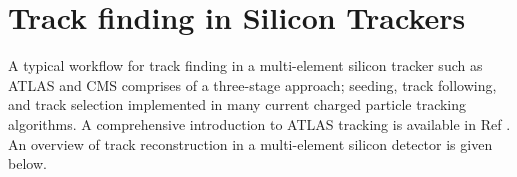 



\section{Track finding in Silicon Trackers}
\label{track-finding-silicon-trackers}



A typical workflow for track finding in a multi-element silicon tracker such as ATLAS and CMS comprises of a three-stage approach; seeding, track following, and track selection implemented in many current charged particle tracking algorithms. A comprehensive introduction to ATLAS tracking is available in Ref \cite{Cornelissen:2007vba}. An overview of track reconstruction in a multi-element silicon detector is given below.



